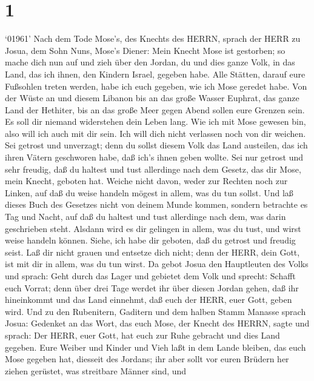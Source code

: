 \hypertarget{section}{%
\section{1}\label{section}}

 `01961' Nach dem Tode Mose's, des Knechts des HERRN, sprach
der HERR zu Josua, dem Sohn Nuns, Mose's Diener:  Mein
Knecht Mose ist gestorben; so mache dich nun auf und zieh über den
Jordan, du und dies ganze Volk, in das Land, das ich ihnen, den Kindern
Israel, gegeben habe.  Alle Stätten, darauf eure Fußsohlen
treten werden, habe ich euch gegeben, wie ich Mose geredet habe.
 Von der Wüste an und diesem Libanon bis an das große Wasser
Euphrat, das ganze Land der Hethiter, bis an das große Meer gegen Abend
sollen eure Grenzen sein.  Es soll dir niemand widerstehen
dein Leben lang. Wie ich mit Mose gewesen bin, also will ich auch mit
dir sein. Ich will dich nicht verlassen noch von dir weichen.
 Sei getrost und unverzagt; denn du sollst diesem Volk das
Land austeilen, das ich ihren Vätern geschworen habe, daß ich's ihnen
geben wollte.  Sei nur getrost und sehr freudig, daß du
haltest und tust allerdinge nach dem Gesetz, das dir Mose, mein Knecht,
geboten hat. Weiche nicht davon, weder zur Rechten noch zur Linken, auf
daß du weise handeln mögest in allem, was du tun sollst. 
Und laß dieses Buch des Gesetzes nicht von deinem Munde kommen, sondern
betrachte es Tag und Nacht, auf daß du haltest und tust allerdinge nach
dem, was darin geschrieben steht. Alsdann wird es dir gelingen in allem,
was du tust, und wirst weise handeln können.  Siehe, ich
habe dir geboten, daß du getrost und freudig seist. Laß dir nicht grauen
und entsetze dich nicht; denn der HERR, dein Gott, ist mit dir in allem,
was du tun wirst.  Da gebot Josua den Hauptleuten des Volks
und sprach:  Geht durch das Lager und gebietet dem Volk und
sprecht: Schafft euch Vorrat; denn über drei Tage werdet ihr über diesen
Jordan gehen, daß ihr hineinkommt und das Land einnehmt, daß euch der
HERR, euer Gott, geben wird.  Und zu den Rubenitern,
Gaditern und dem halben Stamm Manasse sprach Josua: 
Gedenket an das Wort, das euch Mose, der Knecht des HERRN, sagte und
sprach: Der HERR, euer Gott, hat euch zur Ruhe gebracht und dies Land
gegeben.  Eure Weiber und Kinder und Vieh laßt in dem Lande
bleiben, das euch Mose gegeben hat, diesseit des Jordans; ihr aber sollt
vor euren Brüdern her ziehen gerüstet, was streitbare Männer sind, und
